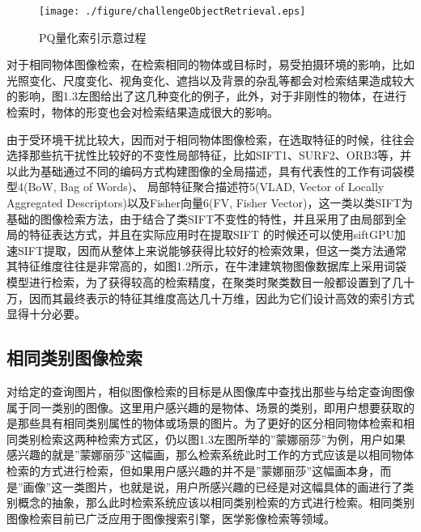\documentclass[color=cyan,mathpazo,titlestyle=hang]{elegantbook}
\begin{document}
\begin{figure}[!hbtp]
\centering  %
\texttt{[image: ./figure/challengeObjectRetrieval.eps]}
\caption{PQ量化索引示意过程\label{pq_ex1}}
\end{figure}

对于相同物体图像检索，在检索相同的物体或目标时，易受拍摄环境的影响，比如光照变化、尺度变化、视角变化、遮挡以及背景的杂乱等都会对检索结果造成较大的影响，图1.3左图给出了这几种变化的例子，此外，对于非刚性的物体，在进行检索时，物体的形变也会对检索结果造成很大的影响。

由于受环境干扰比较大，因而对于相同物体图像检索，在选取特征的时候，往往会选择那些抗干扰性比较好的不变性局部特征，比如SIFT1、SURF2、ORB3等，并以此为基础通过不同的编码方式构建图像的全局描述，具有代表性的工作有词袋模型4(BoW, Bag of Words)、 局部特征聚合描述符5(VLAD, Vector of Locally Aggregated Descriptors)以及Fisher向量6(FV, Fisher Vector)，这一类以类SIFT为基础的图像检索方法，由于结合了类SIFT不变性的特性，并且采用了由局部到全局的特征表达方式，并且在实际应用时在提取SIFT 的时候还可以使用siftGPU加速SIFT提取，因而从整体上来说能够获得比较好的检索效果，但这一类方法通常其特征维度往往是非常高的，如图1.2所示，在牛津建筑物图像数据库上采用词袋模型进行检索，为了获得较高的检索精度，在聚类时聚类数目一般都设置到了几十万，因而其最终表示的特征其维度高达几十万维，因此为它们设计高效的索引方式显得十分必要。

\subsection{相同类别图像检索}

对给定的查询图片，相似图像检索的目标是从图像库中查找出那些与给定查询图像属于同一类别的图像。这里用户感兴趣的是物体、场景的类别，即用户想要获取的是那些具有相同类别属性的物体或场景的图片。为了更好的区分相同物体检索和相同类别检索这两种检索方式区，仍以图1.3左图所举的”蒙娜丽莎”为例，用户如果感兴趣的就是”蒙娜丽莎”这幅画，那么检索系统此时工作的方式应该是以相同物体检索的方式进行检索，但如果用户感兴趣的并不是”蒙娜丽莎”这幅画本身，而是”画像”这一类图片，也就是说，用户所感兴趣的已经是对这幅具体的画进行了类别概念的抽象，那么此时检索系统应该以相同类别检索的方式进行检索。相同类别图像检索目前已广泛应用于图像搜索引擎，医学影像检索等领域。
\end{document}
